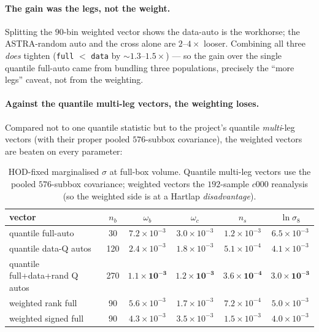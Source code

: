 \documentclass[11pt]{article}
\newcommand{\code}[1]{\texttt{#1}}
\begin{document}
\paragraph{The gain was the legs, not the weight.}  Splitting the $90$-bin weighted
vector shows the data-auto is the workhorse; the ASTRA-random auto and the cross
alone are $2$--$4\times$ looser.  Combining all three \emph{does} tighten
(\code{full} $<$ \code{data} by $\sim\!1.3$--$1.5\times$) --- so the gain over the
single quantile full-auto came from bundling three populations, precisely the ``more
legs'' caveat, not from the weighting.

\paragraph{Against the quantile multi-leg vectors, the weighting loses.}  Compared
not to one quantile statistic but to the project's quantile \emph{multi}-leg vectors
(with their proper pooled $576$-subbox covariance), the weighted vectors are beaten
on every parameter:

\begin{table}[h]
  \centering
  \caption{HOD-fixed marginalised $\sigma$ at full-box volume.  Quantile multi-leg
  vectors use the pooled $576$-subbox covariance; weighted vectors the $192$-sample
  $c000$ reanalysis (so the weighted side is at a Hartlap \emph{disadvantage}).}
  \begin{tabular}{lccccc}
    \hline
    vector & $n_b$ & $\omega_b$ & $\omega_c$ & $n_s$ & $\ln\sigma_8$ \\
    \hline
    quantile full-auto              & 30  & $7.2\!\times\!10^{-3}$ & $3.0\!\times\!10^{-3}$ & $1.2\!\times\!10^{-3}$ & $6.5\!\times\!10^{-3}$ \\
    quantile data-Q autos           & 120 & $2.4\!\times\!10^{-3}$ & $1.8\!\times\!10^{-3}$ & $5.1\!\times\!10^{-4}$ & $4.1\!\times\!10^{-3}$ \\
    quantile full+data+rand Q autos & 270 & $\mathbf{1.1\!\times\!10^{-3}}$ & $\mathbf{1.2\!\times\!10^{-3}}$ & $\mathbf{3.6\!\times\!10^{-4}}$ & $\mathbf{3.0\!\times\!10^{-3}}$ \\
    weighted rank full              & 90  & $5.6\!\times\!10^{-3}$ & $1.7\!\times\!10^{-3}$ & $7.2\!\times\!10^{-4}$ & $5.0\!\times\!10^{-3}$ \\
    weighted signed full            & 90  & $4.3\!\times\!10^{-3}$ & $3.5\!\times\!10^{-3}$ & $1.5\!\times\!10^{-3}$ & $4.0\!\times\!10^{-3}$ \\
    \hline
  \end{tabular}
  \label{tab:fair}
\end{table}
\end{document}
